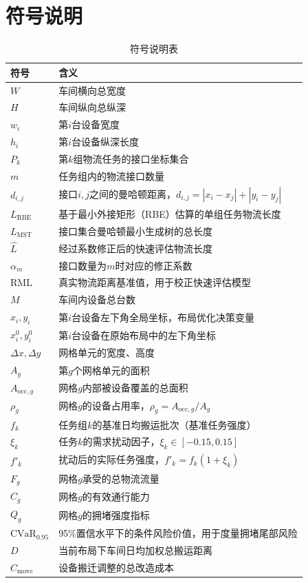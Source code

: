 \documentclass[12pt,a4paper]{article}
\begin{document}
\section{符号说明}
\begin{table}[H]
	\centering
	\begin{tabular}{l l}
		\toprule
		符号 & 含义 \\
		\midrule
		$W$ & 车间横向总宽度 \\
		$H$ & 车间纵向总纵深 \\
		$w_i$ & 第$i$台设备宽度 \\
		$h_i$ & 第$i$台设备纵深长度 \\
		$P_k$ & 第$k$组物流任务的接口坐标集合 \\
		$m$ & 任务组内的物流接口数量 \\
		$d_{i,j}$ & 接口$i,j$之间的曼哈顿距离，$d_{i,j}=|x_i-x_j|+|y_i-y_j|$ \\
		$L_\mathrm{RBE}$ & 基于最小外接矩形（RBE）估算的单组任务物流长度 \\
		$L_\mathrm{MST}$ & 接口集合曼哈顿最小生成树的总长度 \\
		$\hat{L}$ & 经过系数修正后的快速评估物流长度 \\
		$\alpha_m$ & 接口数量为$m$时对应的修正系数 \\
		$\mathrm{RML}$ & 真实物流距离基准值，用于校正快速评估模型 \\
		$M$ & 车间内设备总台数 \\
		$x_i, y_i$ & 第$i$台设备左下角全局坐标，布局优化决策变量 \\
		$x_i^0, y_i^0$ & 第$i$台设备在原始布局中的左下角坐标 \\
		$\Delta x,\Delta y$ & 网格单元的宽度、高度 \\
		$A_g$ & 第$g$个网格单元的面积 \\
		$A_{\mathrm{occ},g}$ & 网格$g$内部被设备覆盖的总面积 \\
		$\rho_g$ & 网格$g$的设备占用率，$\rho_g = A_{\mathrm{occ},g}/A_g$ \\
		$f_k$ & 任务组$k$的基准日均搬运批次（基准任务强度） \\
		$\xi_k$ & 任务$k$的需求扰动因子，$\xi_k\in[-0.15,0.15]$ \\
		$f'_k$ & 扰动后的实际任务强度，$f'_k = f_k(1+\xi_k)$ \\
		$F_g$ & 网格$g$承受的总物流流量 \\
		$C_g$ & 网格$g$的有效通行能力 \\
		$Q_g$ & 网格$g$的拥堵强度指标 \\
		$\mathrm{CVaR}_{0.95}$ & 95\%置信水平下的条件风险价值，用于度量拥堵尾部风险 \\
		$D$ & 当前布局下车间日均加权总搬运距离 \\
		$C_\mathrm{move}$ & 设备搬迁调整的总改造成本 \\
		\bottomrule
	\end{tabular}
	\caption{符号说明表}
\end{table}
\end{document}
